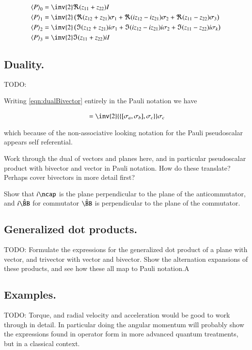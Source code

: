 \documentclass{article}
\newcommand{\symmetric}[2]{{\{{#1},{#2}\}}}
\newcommand{\antisymmetric}[2]{[{#1},{#2}]}
\newcommand{\Bcap}[0]{\hat{\BB}}
\begin{document}
\begin{align*}
\gpgradezero{P} &= \inv{2} \Re( z_{11} + z_{22} ) I \\
\gpgradeone{P} &= \inv{2} \left(
\Re( z_{12} + z_{21} ) \sigma_1
+\Re( iz_{12} - iz_{21} ) \sigma_2
+\Re( z_{11} - z_{22} ) \sigma_3
\right) \\
\gpgradetwo{P}
&= \inv{2} \left(
\Im( z_{12} + z_{21} ) i\sigma_1
+\Im( iz_{12} - iz_{21} ) i\sigma_2
+\Im( z_{11} - z_{22} ) i\sigma_k
\right) \\
\gpgradethree{P} &= \inv{2} \Im( z_{11} + z_{22} ) iI 
\end{align*}

\subsection{ Duality. }

TODO: 

Writing \ref{eqn:dualBivector} entirely in the Pauli notation we have

\begin{align*}
\antisymmetric{\sigma_a}{\sigma_b} 
&= \inv{2} \symmetric{\antisymmetric{\sigma_a}{\sigma_b}}{\sigma_c} \sigma_c \\
\end{align*}

which because of the non-associative looking notation for the Pauli pseudoscalar appears self referential.

Work through the dual of vectors and planes here, and in particular 
pseudoscalar product with bivector and vector in Pauli notation.  How do these
translate?  Perhaps cover bivectors in more detail first?

Show that $i \ncap$ is the plane perpendicular to the plane of the anticommutator, and $i \Bcap$ for commutator $\Bcap$ is perpendicular to the plane of the commutator.

\subsection{ Generalized dot products. }

TODO: Formulate the expressions for the generalized dot product of a plane with vector, and trivector with vector and bivector.  Show the alternation expansions of these products, and see how these all map to Pauli notation.A

\subsection{ Examples. }

TODO: Torque, and radial velocity and acceleration would be good to work through in detail.  In particular doing the
angular momentum will probably show the expressions found in operator form in more advanced quantum treatments, but
in a classical context.



\end{document}
